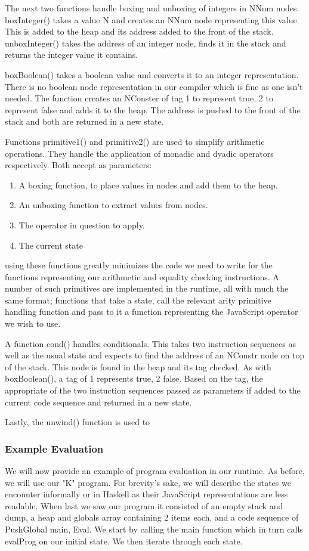 The next two functions handle boxing and unboxing of integers
in NNum nodes. boxInteger() takes a value N and creates an
NNum node representing this value. This is added to the heap
and its address added to the front of the stack. unboxInteger()
takes the address of an integer node, finds it in the stack
and returns the integer value it contains. 

boxBoolean() takes a boolean value and converts it to an
integer representation. There is no boolean node representation
in our compiler which is fine as one isn't needed. The function
creates an NConster of tag 1 to represent true, 2 to represent 
false and adds it to the heap. The address is pushed to the
front of the stack and both are returned in a new state.

Functions primitive1() and primitive2() are used to simplify
arithmetic operations. They handle the application of monadic
and dyadic operators respectively. Both accept as parameters:

\begin{enumerate}
	\item A boxing function, to place values in nodes and
		  add them to the heap.
	\item An unboxing function to extract values from nodes.
	\item The operator in question to apply.
	\item The current state
\end{enumerate}

\noindent using these functions greatly minimizes the code we
need to write for the functions representing our arithmetic and
equality checking instructions. A number of such primitives
are implemented in the runtime, all with much the same format;
functions that take a state, call the relevant arity primitive 
handling function and pass to it a function representing the 
JavaScript operator we wish to use. 

A function cond() handles conditionals. This takes two instruction
sequences as well as the usual state and expects to find the address
of an NConstr node on top of the stack. This node is found in the
heap and its tag checked. As with boxBoolean(), a tag of 1 represents
true, 2 false. Based on the tag, the appropriate of the two instuction
sequences passed as parameters if added to the current code sequence
and returned in a new state.

Lastly, the unwind() function is used to 

\subsubsection{Example Evaluation}
We will now provide an example of program evaluation in our runtime.
As before, we will use our "K" program. For brevity's sake, we will
describe the states we encounter informally or in Haskell as their
JavaScript representations are less readable. When last we saw our
program it consisted of an empty stack and dump, a heap and globals
array containing 2 items each, and a code sequence of PushGlobal
main, Eval. We start by calling the main function which in turn
calls evalProg on our initial state. We then iterate through each
state.

